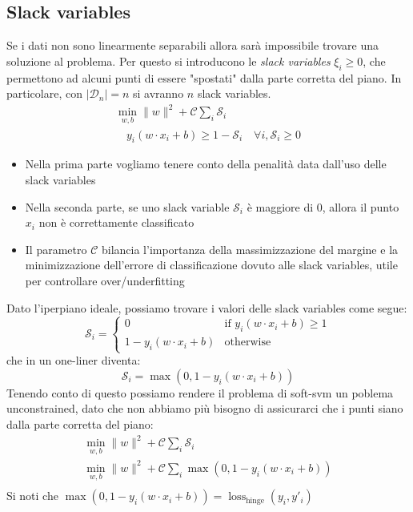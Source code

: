 \subsection{Slack variables}
Se i dati non sono linearmente separabili allora sarà impossibile trovare una soluzione al problema. Per questo si introducono le \textit{slack variables} $ \xi_i \geq 0 $, che permettono ad alcuni punti di essere "spostati" dalla parte corretta del piano. In particolare, con $ \left|\mathcal{D}_n\right| = n $ si avranno $ n $ slack variables.
\begin{gather*}
	\min_{w, b} \|w\|^2  + \mathcal{C} \sum_{i} \mathcal{S}_i\\
	\quad y_i (w \cdot x_i + b) \geq 1 -\mathcal{S}_i \quad \forall i, \mathcal{S}_i \ge 0
\end{gather*}
\begin{itemize}
	\item Nella prima parte vogliamo tenere conto della penalità data dall'uso delle slack variables
	\item Nella seconda parte, se uno slack variable $ \mathcal{S}_i $ è maggiore di 0, allora il punto $ x_i $ non è correttamente classificato
	\item Il parametro $ \mathcal{C} $ bilancia l'importanza della massimizzazione del margine e la minimizzazione dell'errore di classificazione dovuto alle slack variables, utile per controllare over/underfitting
\end{itemize}
Dato l'iperpiano ideale, possiamo trovare i valori delle slack variables come segue:
\[
	\mathcal{S}_i =
	\begin{cases}
		0                        & \text{if } y_i(w \cdot x_i + b) \geq 1 \\
		1 - y_i(w \cdot x_i + b) & \text{otherwise}
	\end{cases}
\]
che in un one-liner diventa:
\[
	\mathcal{S}_i = \operatorname{max}\left(0, 1 - y_i\left(w \cdot x_i + b\right)\right)
\]
Tenendo conto di questo possiamo rendere il problema di soft-svm un poblema unconstrained, dato che non abbiamo più bisogno di assicurarci che i punti siano dalla parte corretta del piano:
\begin{gather*}
	\min_{w, b} \|w\|^2  + \mathcal{C} \sum_{i} \mathcal{S}_i \\
	\min_{w, b} \|w\|^2  + \mathcal{C} \sum_{i} \operatorname{max}\left(0, 1 - y_i\left(w \cdot x_i + b\right)\right)\\
\end{gather*}
Si noti che $ \max\left(0, 1 - y_i\left(w \cdot x_i + b\right)\right) = \operatorname{loss}_{\text{hinge}}\left(y_i, y'_i\right) $

